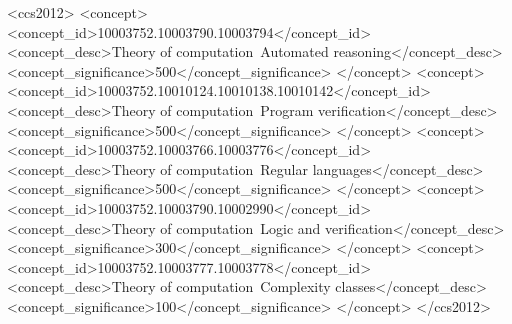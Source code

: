 \documentclass[acmsmall,screen]{acmart}\settopmatter{}
\begin{document}
 
\begin{CCSXML}
	<ccs2012>
	<concept>
	<concept_id>10003752.10003790.10003794</concept_id>
	<concept_desc>Theory of computation~Automated reasoning</concept_desc>
	<concept_significance>500</concept_significance>
	</concept>
	<concept>
	<concept_id>10003752.10010124.10010138.10010142</concept_id>
	<concept_desc>Theory of computation~Program verification</concept_desc>
	<concept_significance>500</concept_significance>
	</concept>
	<concept>
	<concept_id>10003752.10003766.10003776</concept_id>
	<concept_desc>Theory of computation~Regular languages</concept_desc>
	<concept_significance>500</concept_significance>
	</concept>
	<concept>
	<concept_id>10003752.10003790.10002990</concept_id>
	<concept_desc>Theory of computation~Logic and verification</concept_desc>
	<concept_significance>300</concept_significance>
	</concept>
	<concept>
	<concept_id>10003752.10003777.10003778</concept_id>
	<concept_desc>Theory of computation~Complexity classes</concept_desc>
	<concept_significance>100</concept_significance>
	</concept>
	</ccs2012>
\end{CCSXML}



\maketitle


%
%
%
%
%
\end{document}
